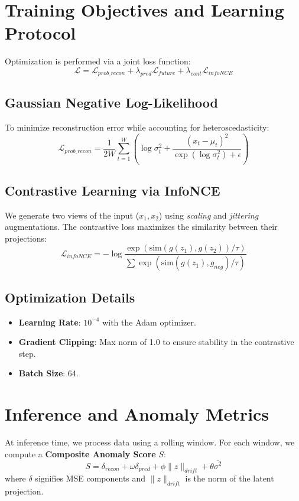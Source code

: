 \documentclass[12pt,a4paper]{article}
\begin{document}
\section{Training Objectives and Learning Protocol}
Optimization is performed via a joint loss function:
\begin{equation}
\mathcal{L} = \mathcal{L}_{prob\_recon} + \lambda_{pred} \mathcal{L}_{future} + \lambda_{cont} \mathcal{L}_{infoNCE}
\end{equation}

\subsection{Gaussian Negative Log-Likelihood}
To minimize reconstruction error while accounting for heteroscedasticity:
\begin{equation}
\mathcal{L}_{prob\_recon} = \frac{1}{2W} \sum_{t=1}^{W} \left( \log \sigma_t^2 + \frac{(x_t - \mu_t)^2}{\exp(\log \sigma_t^2) + \epsilon} \right)
\end{equation}

\subsection{Contrastive Learning via InfoNCE}
We generate two views of the input ($x_1, x_2$) using \textit{scaling} and \textit{jittering} augmentations. The contrastive loss maximizes the similarity between their projections:
\begin{equation}
\mathcal{L}_{infoNCE} = - \log \frac{\exp(\text{sim}(g(z_1), g(z_2)) / \tau)}{\sum \exp(\text{sim}(g(z_1), g_{neg}) / \tau)}
\end{equation}

\subsection{Optimization Details}
\begin{itemize}
    \item \textbf{Learning Rate}: $10^{-4}$ with the Adam optimizer.
    \item \textbf{Gradient Clipping}: Max norm of 1.0 to ensure stability in the contrastive step.
    \item \textbf{Batch Size}: 64.
\end{itemize}

\section{Inference and Anomaly Metrics}
At inference time, we process data using a rolling window. For each window, we compute a \textbf{Composite Anomaly Score} $S$:
\begin{equation}
S = \delta_{recon} + \omega \delta_{pred} + \phi \| z \|_{drift} + \theta \overline{\sigma^2}
\end{equation}
where $\delta$ signifies MSE components and $\| z \|_{drift}$ is the norm of the latent projection.
\end{document}
